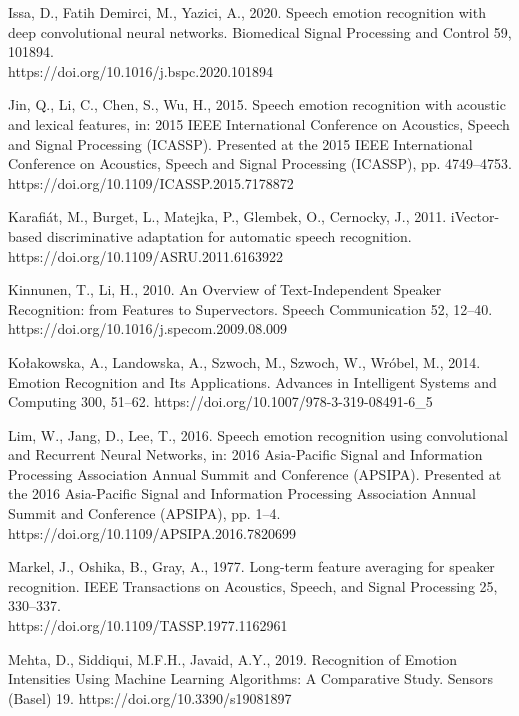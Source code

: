 \small
\hangindent=0.5cm
Issa, D., Fatih Demirci, M., Yazici, A., 2020. Speech emotion recognition with deep convolutional neural networks. Biomedical Signal Processing and Control 59, 101894. \\https://doi.org/10.1016/j.bspc.2020.101894

\small
\hangindent=0.5cm
Jin, Q., Li, C., Chen, S., Wu, H., 2015. Speech emotion recognition with acoustic and lexical features, in: 2015 IEEE International Conference on Acoustics, Speech and Signal Processing (ICASSP). Presented at the 2015 IEEE International Conference on Acoustics, Speech and Signal Processing (ICASSP), pp. 4749–4753. https://doi.org/10.1109/ICASSP.2015.7178872

\small
\hangindent=0.5cm
Karafiát, M., Burget, L., Matejka, P., Glembek, O., Cernocky, J., 2011. iVector-based discriminative adaptation for automatic speech recognition. https://doi.org/10.1109/ASRU.2011.6163922

\small
\hangindent=0.5cm
Kinnunen, T., Li, H., 2010. An Overview of Text-Independent Speaker Recognition: from Features to Supervectors. Speech Communication 52, 12–40. https://doi.org/10.1016/j.specom.2009.08.009

\small
\hangindent=0.5cm
Kołakowska, A., Landowska, A., Szwoch, M., Szwoch, W., Wróbel, M., 2014. Emotion Recognition and Its Applications. Advances in Intelligent Systems and Computing 300, 51–62. https://doi.org/10.1007/978-3-319-08491-6\_5

\small
\hangindent=0.5cm
Lim, W., Jang, D., Lee, T., 2016. Speech emotion recognition using convolutional and Recurrent Neural Networks, in: 2016 Asia-Pacific Signal and Information Processing Association Annual Summit and Conference (APSIPA). Presented at the 2016 Asia-Pacific Signal and Information Processing Association Annual Summit and Conference (APSIPA), pp. 1–4. \\https://doi.org/10.1109/APSIPA.2016.7820699

\small
\hangindent=0.5cm
Markel, J., Oshika, B., Gray, A., 1977. Long-term feature averaging for speaker recognition. IEEE Transactions on Acoustics, Speech, and Signal Processing 25, 330–337.\\ https://doi.org/10.1109/TASSP.1977.1162961

\small
\hangindent=0.5cm
Mehta, D., Siddiqui, M.F.H., Javaid, A.Y., 2019. Recognition of Emotion Intensities Using Machine Learning Algorithms: A Comparative Study. Sensors (Basel) 19. https://doi.org/10.3390/s19081897

